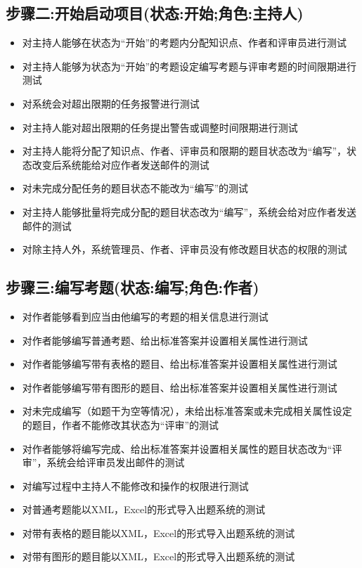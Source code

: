 \documentclass[hyperref, a4paper]{ctexart}
\providecommand{\tightlist}{%
  \setlength{\itemsep}{0pt}\setlength{\parskip}{0pt}}
\begin{document}
\hypertarget{ux6b65ux9aa4ux4e8cux5f00ux59cbux542fux52a8ux9879ux76eeux72b6ux6001ux5f00ux59cbux89d2ux8272ux4e3bux6301ux4eba}{%
\subsection{步骤二:开始启动项目(状态:开始;角色:主持人)}\label{ux6b65ux9aa4ux4e8cux5f00ux59cbux542fux52a8ux9879ux76eeux72b6ux6001ux5f00ux59cbux89d2ux8272ux4e3bux6301ux4eba}}

\begin{itemize}
\item
  对主持人能够在状态为``开始''的考题内分配知识点、作者和评审员进行测试
\item
  对主持人能够为状态为``开始''的考题设定编写考题与评审考题的时间限期进行测试
\item
  对系统会对超出限期的任务报警进行测试
\item
  对主持人能对超出限期的任务提出警告或调整时间限期进行测试
\item
  对主持人能将分配了知识点、作者、评审员和限期的题目状态改为``编写''，状态改变后系统能给对应作者发送邮件的测试
\item
  对未完成分配任务的题目状态不能改为``编写''的测试
\item
  对主持人能够批量将完成分配的题目状态改为``编写''，系统会给对应作者发送邮件的测试
\item
  对除主持人外，系统管理员、作者、评审员没有修改题目状态的权限的测试
\end{itemize}

\hypertarget{ux6b65ux9aa4ux4e09ux7f16ux5199ux8003ux9898ux72b6ux6001ux7f16ux5199ux89d2ux8272ux4f5cux8005}{%
\subsection{步骤三:编写考题(状态:编写;角色:作者)}\label{ux6b65ux9aa4ux4e09ux7f16ux5199ux8003ux9898ux72b6ux6001ux7f16ux5199ux89d2ux8272ux4f5cux8005}}

\begin{itemize}
\tightlist
\item
  对作者能够看到应当由他编写的考题的相关信息进行测试
\item
  对作者能够编写普通考题、给出标准答案并设置相关属性进行测试
\item
  对作者能够编写带有表格的题目、给出标准答案并设置相关属性进行测试
\item
  对作者能够编写带有图形的题目、给出标准答案并设置相关属性进行测试
\item
  对未完成编写（如题干为空等情况），未给出标准答案或未完成相关属性设定的题目，作者不能修改其状态为``评审''的测试
\item
  对作者能够将编写完成、给出标准答案并设置相关属性的题目状态改为``评审''，系统会给评审员发出邮件的测试
\item
  对编写过程中主持人不能修改和操作的权限进行测试
\item
  对普通考题能以XML，Excel的形式导入出题系统的测试
\item
  对带有表格的题目能以XML，Excel的形式导入出题系统的测试
\item
  对带有图形的题目能以XML，Excel的形式导入出题系统的测试
\end{itemize}
\end{document}
